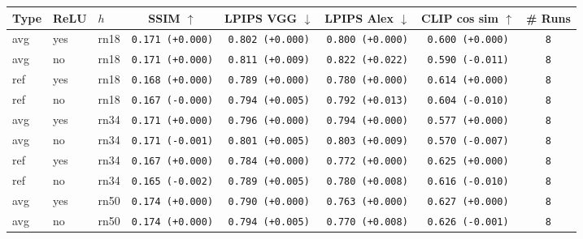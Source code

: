 \begin{tabular}{|l|l|l|c|c|c|c|c|}
\hline
Type & ReLU & $h$ & SSIM $\uparrow$ & LPIPS VGG $\downarrow$ & LPIPS Alex $\downarrow$ & CLIP cos sim $\uparrow$ & \# Runs \\
\hline
\rowcolor{verylightgray}avg & yes & rn18 & \texttt{0.171 {\color{black}(+0.000)}} & \texttt{0.802 {\color{black}(+0.000)}} & \texttt{0.800 {\color{black}(+0.000)}} & \texttt{0.600 {\color{black}(+0.000)}} & \texttt{8} \\
avg & no & rn18 & \texttt{0.171 {\color{black}(+0.000)}} & \texttt{0.811 {\color{red}(+0.009)}} & \texttt{0.822 {\color{red}(+0.022)}} & \texttt{0.590 {\color{red}(-0.011)}} & \texttt{8} \\
\hline
\rowcolor{verylightgray}ref & yes & rn18 & \texttt{0.168 {\color{black}(+0.000)}} & \texttt{0.789 {\color{black}(+0.000)}} & \texttt{0.780 {\color{black}(+0.000)}} & \texttt{0.614 {\color{black}(+0.000)}} & \texttt{8} \\
ref & no & rn18 & \texttt{0.167 {\color{black}(-0.000)}} & \texttt{0.794 {\color{red}(+0.005)}} & \texttt{0.792 {\color{red}(+0.013)}} & \texttt{0.604 {\color{red}(-0.010)}} & \texttt{8} \\
\hline
\rowcolor{verylightgray}avg & yes & rn34 & \texttt{0.171 {\color{black}(+0.000)}} & \texttt{0.796 {\color{black}(+0.000)}} & \texttt{0.794 {\color{black}(+0.000)}} & \texttt{0.577 {\color{black}(+0.000)}} & \texttt{8} \\
avg & no & rn34 & \texttt{0.171 {\color{red}(-0.001)}} & \texttt{0.801 {\color{red}(+0.005)}} & \texttt{0.803 {\color{red}(+0.009)}} & \texttt{0.570 {\color{red}(-0.007)}} & \texttt{8} \\
\hline
\rowcolor{verylightgray}ref & yes & rn34 & \texttt{0.167 {\color{black}(+0.000)}} & \texttt{0.784 {\color{black}(+0.000)}} & \texttt{0.772 {\color{black}(+0.000)}} & \texttt{0.625 {\color{black}(+0.000)}} & \texttt{8} \\
ref & no & rn34 & \texttt{0.165 {\color{red}(-0.002)}} & \texttt{0.789 {\color{red}(+0.005)}} & \texttt{0.780 {\color{red}(+0.008)}} & \texttt{0.616 {\color{red}(-0.010)}} & \texttt{8} \\
\hline
\rowcolor{verylightgray}avg & yes & rn50 & \texttt{0.174 {\color{black}(+0.000)}} & \texttt{0.790 {\color{black}(+0.000)}} & \texttt{0.763 {\color{black}(+0.000)}} & \texttt{0.627 {\color{black}(+0.000)}} & \texttt{8} \\
avg & no & rn50 & \texttt{0.174 {\color{black}(+0.000)}} & \texttt{0.794 {\color{red}(+0.005)}} & \texttt{0.770 {\color{red}(+0.008)}} & \texttt{0.626 {\color{red}(-0.001)}} & \texttt{8} \\

\end{tabular}
